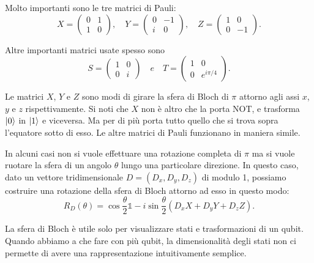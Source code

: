 Molto importanti sono le tre matrici di Pauli: 
\begin{equation}
    X=\begin{pmatrix}
        0&1\\1&0
    \end{pmatrix},
    \quad Y = \begin{pmatrix}
        0&-1 \\ i&0
    \end{pmatrix},
    \quad Z = \begin{pmatrix}
        1&0 \\ 0&-1
    \end{pmatrix}.
\end{equation}

Altre importanti matrici usate spesso sono 
\begin{equation}
    S=\begin{pmatrix}
        1&0\\0&i
    \end{pmatrix}
    \quad e \quad T = \begin{pmatrix}
        1&0\\0&e^{i\pi/4}
    \end{pmatrix}.
\end{equation}

Le matrici $X$, $Y$ e $Z$ sono modi di girare la 
sfera di Bloch di $\pi$ attorno agli assi $x$, $y$ e $z$ rispettivamente. 
Si noti che $X$ non è altro che la porta NOT, e trasforma $\ket{0}$ in $\ket{1}$ 
e viceversa. Ma per di più porta tutto quello che si trova sopra l'equatore 
sotto di esso. Le altre matrici di Pauli funzionano in maniera simile. 

In alcuni casi non si vuole effettuare una rotazione completa di $\pi$ 
ma si vuole ruotare la sfera di un angolo $\theta$ lungo una particolare direzione. 
In questo caso, dato un vettore tridimensionale $D=(D_x, D_y, D_z)$ di modulo 1, 
possiamo costruire una rotazione della sfera di Bloch attorno ad esso in questo 
modo: 
\begin{equation}
    R_D(\theta)=\cos\frac{\theta}{2}\mathbb{1} - i \sin \frac{\theta}{2} 
    (D_x X + D_y Y + D_z Z). 
\end{equation}

La sfera di Bloch è utile solo per visualizzare stati e trasformazioni di un qubit. 
Quando abbiamo a che fare con più qubit, la dimensionalità degli stati non ci 
permette di avere una rappresentazione intuitivamente semplice. 

